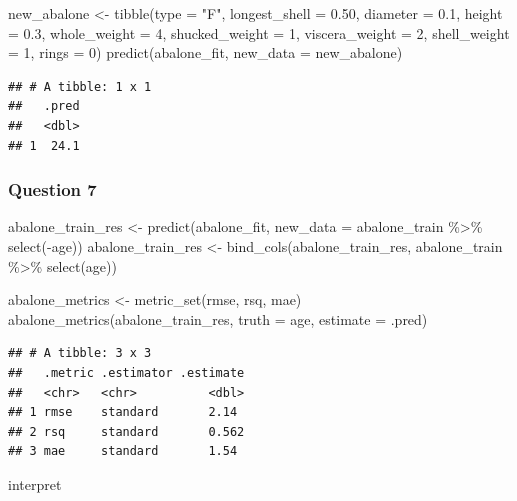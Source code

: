 \documentclass[
]{article}
\newenvironment{Shaded}{\begin{snugshade}}{\end{snugshade}}
\newcommand{\AttributeTok}[1]{\textcolor[rgb]{0.77,0.63,0.00}{#1}}
\newcommand{\DecValTok}[1]{\textcolor[rgb]{0.00,0.00,0.81}{#1}}
\newcommand{\FloatTok}[1]{\textcolor[rgb]{0.00,0.00,0.81}{#1}}
\newcommand{\FunctionTok}[1]{\textcolor[rgb]{0.00,0.00,0.00}{#1}}
\newcommand{\NormalTok}[1]{#1}
\newcommand{\OtherTok}[1]{\textcolor[rgb]{0.56,0.35,0.01}{#1}}
\newcommand{\SpecialCharTok}[1]{\textcolor[rgb]{0.00,0.00,0.00}{#1}}
\newcommand{\StringTok}[1]{\textcolor[rgb]{0.31,0.60,0.02}{#1}}
\begin{document}
\begin{Shaded}
\begin{Highlighting}[]
\NormalTok{new\_abalone }\OtherTok{\textless{}{-}} \FunctionTok{tibble}\NormalTok{(}\AttributeTok{type =} \StringTok{"F"}\NormalTok{, }\AttributeTok{longest\_shell =} \FloatTok{0.50}\NormalTok{, }\AttributeTok{diameter =} \FloatTok{0.1}\NormalTok{, }\AttributeTok{height =} \FloatTok{0.3}\NormalTok{, }\AttributeTok{whole\_weight =} \DecValTok{4}\NormalTok{, }\AttributeTok{shucked\_weight =} \DecValTok{1}\NormalTok{, }\AttributeTok{viscera\_weight =} \DecValTok{2}\NormalTok{, }\AttributeTok{shell\_weight =} \DecValTok{1}\NormalTok{, }\AttributeTok{rings =} \DecValTok{0}\NormalTok{)}
\FunctionTok{predict}\NormalTok{(abalone\_fit, }\AttributeTok{new\_data =}\NormalTok{ new\_abalone)}
\end{Highlighting}
\end{Shaded}

\begin{verbatim}
## # A tibble: 1 x 1
##   .pred
##   <dbl>
## 1  24.1
\end{verbatim}

\hypertarget{question-7}{%
\subsubsection{Question 7}\label{question-7}}

\begin{Shaded}
\begin{Highlighting}[]
\NormalTok{abalone\_train\_res }\OtherTok{\textless{}{-}} \FunctionTok{predict}\NormalTok{(abalone\_fit, }\AttributeTok{new\_data =}\NormalTok{ abalone\_train }\SpecialCharTok{\%\textgreater{}\%} \FunctionTok{select}\NormalTok{(}\SpecialCharTok{{-}}\NormalTok{age))}
\NormalTok{abalone\_train\_res }\OtherTok{\textless{}{-}} \FunctionTok{bind\_cols}\NormalTok{(abalone\_train\_res, abalone\_train }\SpecialCharTok{\%\textgreater{}\%} \FunctionTok{select}\NormalTok{(age))}


\NormalTok{abalone\_metrics }\OtherTok{\textless{}{-}} \FunctionTok{metric\_set}\NormalTok{(rmse, rsq, mae)}
\FunctionTok{abalone\_metrics}\NormalTok{(abalone\_train\_res, }\AttributeTok{truth =}\NormalTok{ age, }
                \AttributeTok{estimate =}\NormalTok{ .pred)}
\end{Highlighting}
\end{Shaded}

\begin{verbatim}
## # A tibble: 3 x 3
##   .metric .estimator .estimate
##   <chr>   <chr>          <dbl>
## 1 rmse    standard       2.14 
## 2 rsq     standard       0.562
## 3 mae     standard       1.54
\end{verbatim}

interpret
\end{document}
